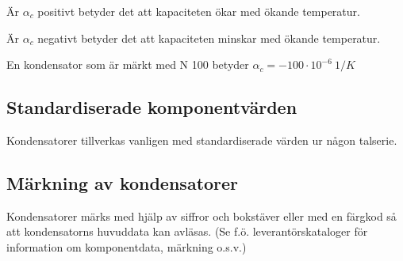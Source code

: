 Är \(\alpha _c\) positivt betyder det att kapaciteten ökar med ökande
temperatur.

Är \(\alpha _c\) negativt betyder det att kapaciteten minskar med ökande
temperatur.

En kondensator som är märkt med N 100 betyder
\(\alpha _c = -100 \cdot 10^{-6}\ 1/K\)

\subsection{Standardiserade komponentvärden}

Kondensatorer tillverkas vanligen med standardiserade värden ur någon talserie.

\subsection{Märkning av kondensatorer}

Kondensatorer märks med hjälp av siffror och bokstäver eller med en färgkod så att
kondensatorns huvuddata kan avläsas.
(Se f.ö. leverantörskataloger för information om komponentdata, märkning o.s.v.)
